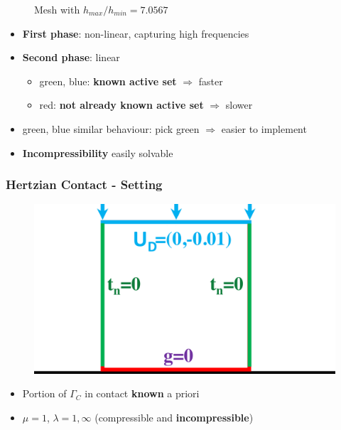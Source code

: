 \documentclass[8pt, oneside]{beamer}   	%
\newcommand{\colb}{\color{myblue}}
\newcommand{\colg}{\color{mygreen}}
\newcommand{\colo}{\color{orange}}
\newcommand{\titlecolor}[1]{\frametitle{\textcolor{dkgrey}{ \textbf{#1}}}}
\begin{document}
\begin{frame}
\begin{figure}[htbp!]
	\caption{Mesh with $h_{max}/h_{min}=7.0567$}
		\label{ResidualRateVeryNonUniform}
\end{figure}
\begin{itemize}
\item \textbf{First phase}: non-linear, capturing high frequencies
\item \textbf{Second phase}: linear
\begin{itemize}
\item {\colg green},  {\colb blue}: \textbf{known active set }$\Rightarrow$ faster
\item {\colo red}: \textbf{not already known active set }$\Rightarrow$ slower
\end{itemize}
\item {\colg green},  {\colb blue} similar behaviour: pick {\colg green} $\Rightarrow$ easier to implement 
\item \textbf{Incompressibility} easily solvable
\end{itemize}
\end{frame}


\begin{frame}
\titlecolor{Hertzian Contact - Setting}
\begin{figure}[htbp!]
\includegraphics[scale=0.2]{img/signorinisquare.pdf} 
\end{figure}
\begin{itemize}
\item Portion of $\Gamma_C$ in contact \textbf{known} a priori
\item $ \mu = 1$, $ \lambda = 1, \infty$ (compressible and \textbf{incompressible})
\end{itemize}
\end{frame}
\end{document}
